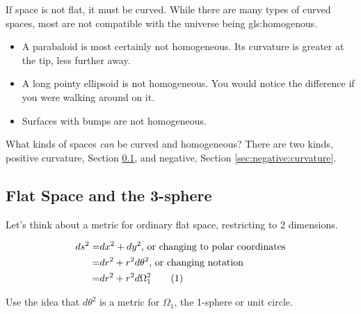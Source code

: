 \documentclass[]{article}
\newcommand\numberthis{\addtocounter{equation}{1}\tag{\theequation}}
\begin{document}
If space is not flat, it must be curved. While there are many types of curved spaces, most are not compatible with the universe being \gls{gls:homogenous}.

\begin{itemize}
	\item A parabaloid is most certainly not homogeneous. Its curvature is greater at the tip, less further away.
	\item A long pointy ellipsoid is not homogeneous. You would notice the difference if you were walking around on it.
	\item Surfaces with bumps are not homogeneous.
\end{itemize}

What kinds of spaces \emph{can} be curved and homogeneous? There are two kinds, positive curvature, Section \ref{sec:positive:curvature}, and negative, Section \ref{sec:negative:curvature}.

\subsection{Flat Space and the 3-sphere}\label{sec:positive:curvature}

Let's think about a metric for ordinary flat space, restricting to 2 dimensions.

\begin{align*}
	ds^2 =& dx^2 + dy^2\text{, or changing to polar coordinates}\\
	=&dr^2 + r^2 d\theta^2 \text{, or changing notation}\\
	=&dr^2 + r^2 d\Omega_1^2 \numberthis \label{eq:flat:polar}
\end{align*}

Use the idea that $d\theta^2$ is a  metric for $\Omega_1$, the 1-sphere or unit circle.
\end{document}
